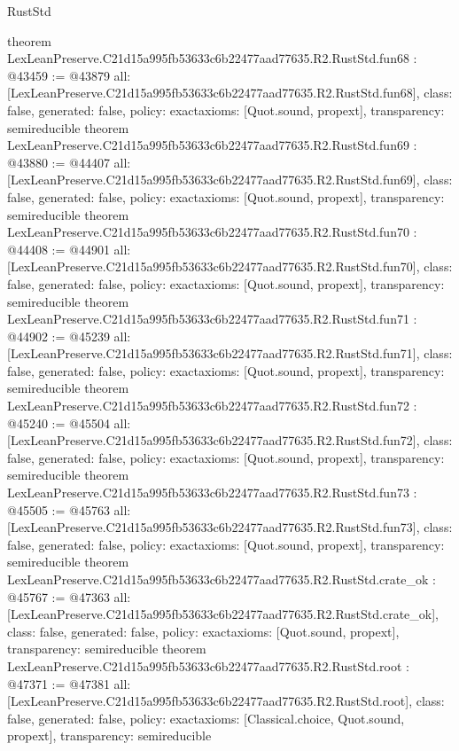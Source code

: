 \begin{lexlean}{RustStd}
\begin{coremodule}
{}
theorem LexLeanPreserve.C21d15a995fb53633c6b22477aad77635.R2.RustStd.fun68 : @43459 := @43879 {
  all: [LexLeanPreserve.C21d15a995fb53633c6b22477aad77635.R2.RustStd.fun68],
  class: false,
  generated: false,
  policy: exact{axioms: [Quot.sound, propext]},
  transparency: semireducible
}
theorem LexLeanPreserve.C21d15a995fb53633c6b22477aad77635.R2.RustStd.fun69 : @43880 := @44407 {
  all: [LexLeanPreserve.C21d15a995fb53633c6b22477aad77635.R2.RustStd.fun69],
  class: false,
  generated: false,
  policy: exact{axioms: [Quot.sound, propext]},
  transparency: semireducible
}
theorem LexLeanPreserve.C21d15a995fb53633c6b22477aad77635.R2.RustStd.fun70 : @44408 := @44901 {
  all: [LexLeanPreserve.C21d15a995fb53633c6b22477aad77635.R2.RustStd.fun70],
  class: false,
  generated: false,
  policy: exact{axioms: [Quot.sound, propext]},
  transparency: semireducible
}
theorem LexLeanPreserve.C21d15a995fb53633c6b22477aad77635.R2.RustStd.fun71 : @44902 := @45239 {
  all: [LexLeanPreserve.C21d15a995fb53633c6b22477aad77635.R2.RustStd.fun71],
  class: false,
  generated: false,
  policy: exact{axioms: [Quot.sound, propext]},
  transparency: semireducible
}
theorem LexLeanPreserve.C21d15a995fb53633c6b22477aad77635.R2.RustStd.fun72 : @45240 := @45504 {
  all: [LexLeanPreserve.C21d15a995fb53633c6b22477aad77635.R2.RustStd.fun72],
  class: false,
  generated: false,
  policy: exact{axioms: [Quot.sound, propext]},
  transparency: semireducible
}
theorem LexLeanPreserve.C21d15a995fb53633c6b22477aad77635.R2.RustStd.fun73 : @45505 := @45763 {
  all: [LexLeanPreserve.C21d15a995fb53633c6b22477aad77635.R2.RustStd.fun73],
  class: false,
  generated: false,
  policy: exact{axioms: [Quot.sound, propext]},
  transparency: semireducible
}
theorem LexLeanPreserve.C21d15a995fb53633c6b22477aad77635.R2.RustStd.crate_ok : @45767 := @47363 {
  all: [LexLeanPreserve.C21d15a995fb53633c6b22477aad77635.R2.RustStd.crate_ok],
  class: false,
  generated: false,
  policy: exact{axioms: [Quot.sound, propext]},
  transparency: semireducible
}
theorem LexLeanPreserve.C21d15a995fb53633c6b22477aad77635.R2.RustStd.root : @47371 := @47381 {
  all: [LexLeanPreserve.C21d15a995fb53633c6b22477aad77635.R2.RustStd.root],
  class: false,
  generated: false,
  policy: exact{axioms: [Classical.choice, Quot.sound, propext]},
  transparency: semireducible
}


\end{coremodule}
\end{lexlean}
